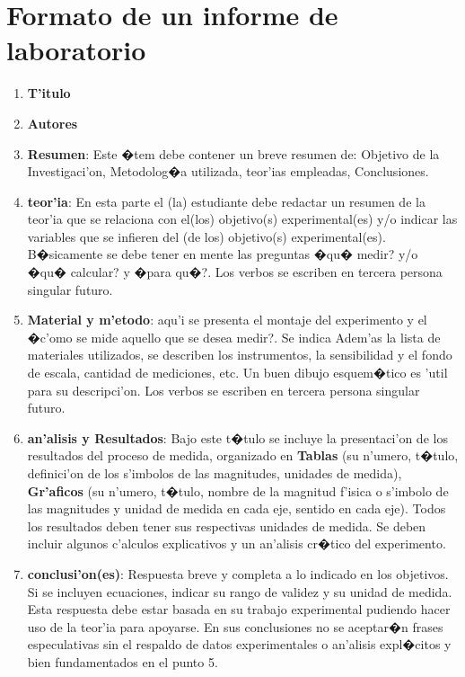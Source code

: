 \chapter{Formato de un informe de laboratorio}
\begin{enumerate}
\item \textbf{T'itulo}
\item \textbf{Autores}
\item \textbf{Resumen}: Este �tem debe contener un breve resumen de:
  Objetivo de la Investigaci'on, Metodolog�a utilizada, teor'ias empleadas, Conclusiones.
\item \textbf{teor'ia}: En esta parte el (la) estudiante debe redactar un resumen de la teor'ia que se relaciona con el(los) objetivo(s) experimental(es) y/o indicar las variables que se infieren del (de los) objetivo(s) experimental(es). B�sicamente se debe tener en mente las preguntas �qu� medir? y/o �qu� calcular? y �para qu�?. Los verbos se escriben en tercera persona singular futuro.
\item \textbf{Material y m'etodo}: aqu'i se presenta el montaje del experimento y el �c'omo se mide aquello que se desea medir?. Se indica Adem'as la lista de materiales utilizados, se describen los instrumentos, la sensibilidad y el fondo de escala, cantidad de mediciones, etc. Un buen dibujo esquem�tico es 'util para su descripci'on. Los verbos se escriben en tercera persona singular futuro.
\item \textbf{an'alisis y Resultados}: Bajo este t�tulo se incluye la presentaci'on de los resultados del proceso de medida, organizado en
\textbf{Tablas} (su n'umero, t�tulo, definici'on de los s'imbolos de las magnitudes, unidades de medida), \textbf{Gr'aficos} (su n'umero, t�tulo, nombre de la magnitud f'isica o s'imbolo de las magnitudes y unidad de medida en cada eje, sentido en cada eje). Todos los resultados deben tener sus respectivas unidades de medida. Se deben incluir algunos c'alculos explicativos y un an'alisis cr�tico del experimento.
\item \textbf{conclusi'on(es)}: Respuesta breve y completa a lo indicado en los objetivos. Si se incluyen ecuaciones, indicar su rango de validez y su unidad de medida. Esta respuesta debe estar basada en su trabajo experimental pudiendo hacer uso de la teor'ia para apoyarse. En sus conclusiones no se aceptar�n frases especulativas sin el respaldo de datos experimentales o an'alisis expl�citos y bien fundamentados en el punto 5.
\end{enumerate}

